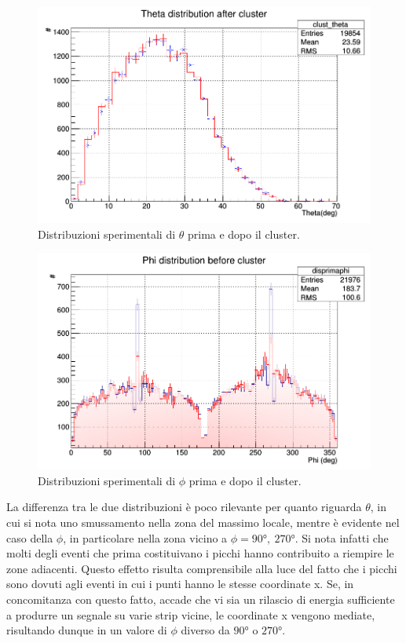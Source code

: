 \documentclass[8pt]{extarticle}
\begin{document}
\begin{figure}[h]
\centering
  \includegraphics[width=0.8\linewidth]{distheta_clust}
  \caption{Distribuzioni sperimentali di $\theta$ prima e dopo il cluster.}
  \label{fig:distheta_clust}
\end{figure}%


\begin{figure}[h]
\centering
  \includegraphics[width=0.8\linewidth]{disphi_clust}
  \caption{Distribuzioni sperimentali di $\phi$ prima e dopo il cluster.}
  \label{fig:distheta_clust}
\end{figure}%

La differenza tra le due distribuzioni è poco rilevante per quanto riguarda $\theta$, in cui si nota uno smussamento nella zona del massimo locale, mentre è evidente nel caso della $\phi$, in particolare nella zona vicino a $\phi = 90°, \ 270°$. Si nota infatti che molti degli eventi che prima costituivano i picchi hanno contribuito a riempire le zone adiacenti. Questo effetto risulta comprensibile alla luce del fatto che i picchi sono dovuti agli eventi in cui i punti hanno le stesse coordinate x. Se, in concomitanza con questo fatto, accade che vi sia un rilascio di energia sufficiente a produrre un segnale su varie strip vicine, le coordinate x vengono mediate, risultando dunque in un valore di $\phi$ diverso da $90°$ o $270°$. \\
\end{document}
